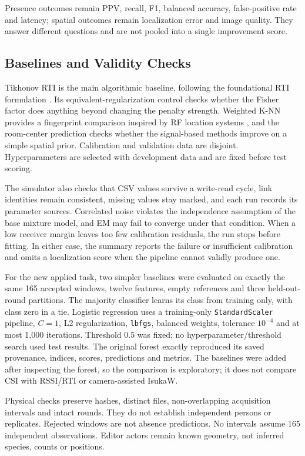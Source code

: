 \documentclass[sensors,article,submit,oneauthor]{Definitions/mdpi}
\begin{document}
Presence outcomes remain PPV, recall, F1, balanced accuracy, false-positive rate and latency; spatial outcomes remain localization error and image quality. They answer different questions and are not pooled into a single improvement score.
\subsection{Baselines and Validity Checks}

Tikhonov RTI is the main algorithmic baseline, following the foundational RTI formulation \cite{Wilson2010}. Its equivalent-regularization control checks whether the Fisher factor does anything beyond changing the penalty strength. Weighted K-NN provides a fingerprint comparison inspired by RF location systems \cite{Bahl2000}, and the room-center prediction checks whether the signal-based methods improve on a simple spatial prior. Calibration and validation data are disjoint. Hyperparameters are selected with development data and are fixed before test scoring.

The simulator also checks that CSV values survive a write-read cycle, link identities remain consistent, missing values stay marked, and each run records its parameter sources. Correlated noise violates the independence assumption of the base mixture model, and EM may fail to converge under that condition. When a low receiver margin leaves too few calibration residuals, the run stops before fitting. In either case, the summary reports the failure or insufficient calibration and omits a localization score when the pipeline cannot validly produce one.

For the new applied task, two simpler baselines were evaluated on exactly the same 165 accepted windows, twelve features, empty references and three held-out-round partitions. The majority classifier learns its class from training only, with class zero in a tie. Logistic regression uses a training-only \texttt{StandardScaler} pipeline, $C=1$, L2 regularization, \texttt{lbfgs}, balanced weights, tolerance $10^{-4}$ and at most 1,000 iterations. Threshold 0.5 was fixed; no hyperparameter/threshold search used test results. The original forest exactly reproduced its saved provenance, indices, scores, predictions and metrics. The baselines were added after inspecting the forest, so the comparison is exploratory; it does not compare CSI with RSSI/RTI or camera-assisted IsukaW.

Physical checks preserve hashes, distinct files, non-overlapping acquisition intervals and intact rounds. They do not establish independent persons or replicates. Rejected windows are not absence predictions. No intervals assume 165 independent observations. Editor actors remain known geometry, not inferred species, counts or positions.
\end{document}
